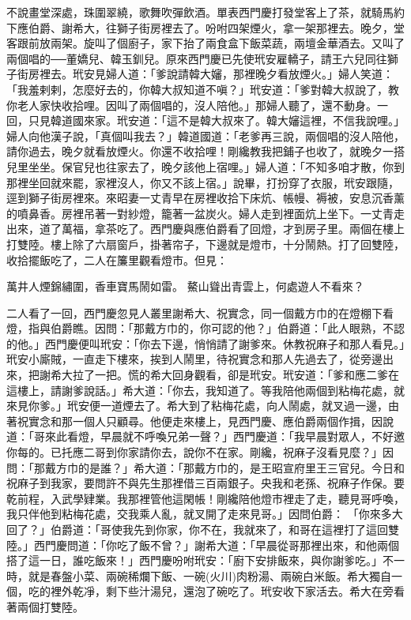 不說畫堂深處，珠圍翠繞，歌舞吹彈飲酒。單表西門慶打發堂客上了茶，就騎馬約下應伯爵、謝希大，往獅子街房裡去了。吩咐四架煙火，拿一架那裡去。晚夕，堂客跟前放兩架。旋叫了個廚子，家下抬了兩食盒下飯菜蔬，兩壇金華酒去。又叫了兩個唱的──董嬌兒、韓玉釧兒。原來西門慶已先使玳安雇轎子，請王六兒同往獅子街房裡去。玳安見婦人道：「爹說請韓大嬸，那裡晚夕看放煙火。」婦人笑道：「我羞剌剌，怎麼好去的，你韓大叔知道不嗔？」玳安道：「爹對韓大叔說了，教你老人家快收拾哩。因叫了兩個唱的，沒人陪他。」那婦人聽了，還不動身。一回，只見韓道國來家。玳安道：「這不是韓大叔來了。韓大嬸這裡，不信我說哩。」 婦人向他漢子說，「真個叫我去？」韓道國道：「老爹再三說，兩個唱的沒人陪他，請你過去，晚夕就看放煙火。你還不收拾哩！剛纔教我把鋪子也收了，就晚夕一搭兒里坐坐。保官兒也往家去了，晚夕該他上宿哩。」婦人道：「不知多咱才散，你到那裡坐回就來罷，家裡沒人，你又不該上宿。」說畢，打扮穿了衣服，玳安跟隨，逕到獅子街房裡來。來昭妻一丈青早在房裡收拾下床炕、帳幔、褥被，安息沉香薰的噴鼻香。房裡吊著一對紗燈，籠著一盆炭火。婦人走到裡面炕上坐下。一丈青走出來，道了萬福，拿茶吃了。西門慶與應伯爵看了回燈，才到房子里。兩個在樓上打雙陸。樓上除了六扇窗戶，掛著帘子，下邊就是燈市，十分鬧熱。打了回雙陸，收拾擺飯吃了，二人在簾里觀看燈市。但見：

萬井人煙錦繡圍，香車寶馬鬧如雷。
鰲山聳出青雲上，何處遊人不看來？

二人看了一回，西門慶忽見人叢里謝希大、祝實念，同一個戴方巾的在燈棚下看燈，指與伯爵瞧。因問：「那戴方巾的，你可認的他？」伯爵道：「此人眼熟，不認的他。」西門慶便叫玳安：「你去下邊，悄悄請了謝爹來。休教祝麻子和那人看見。」玳安小廝賊，一直走下樓來，挨到人鬧里，待祝實念和那人先過去了，從旁邊出來，把謝希大拉了一把。慌的希大回身觀看，卻是玳安。玳安道：「爹和應二爹在這樓上，請謝爹說話。」希大道：「你去，我知道了。等我陪他兩個到粘梅花處，就來見你爹。」玳安便一道煙去了。希大到了粘梅花處，向人鬧處，就叉過一邊，由著祝實念和那一個人只顧尋。他便走來樓上，見西門慶、應伯爵兩個作揖，因說道：「哥來此看燈，早晨就不呼喚兄弟一聲？」西門慶道：「我早晨對眾人，不好邀你每的。已托應二哥到你家請你去，說你不在家。剛纔，祝麻子沒看見麼？」因問：「那戴方巾的是誰？」希大道：「那戴方巾的，是王昭宣府里王三官兒。今日和祝麻子到我家，要問許不與先生那裡借三百兩銀子。央我和老孫、祝麻子作保。要乾前程，入武學肄業。我那裡管他這閑帳！剛纔陪他燈市裡走了走，聽見哥呼喚，我只伴他到粘梅花處，交我乘人亂，就叉開了走來見哥。」因問伯爵： 「你來多大回了？」伯爵道：「哥使我先到你家，你不在，我就來了，和哥在這裡打了這回雙陸。」西門慶問道：「你吃了飯不曾？」謝希大道：「早晨從哥那裡出來，和他兩個搭了這一日，誰吃飯來！」西門慶吩咐玳安：「廚下安排飯來，與你謝爹吃。」不一時，就是春盤小菜、兩碗稀爛下飯、一碗(火川)肉粉湯、兩碗白米飯。希大獨自一個，吃的裡外乾凈，剩下些汁湯兒，還泡了碗吃了。玳安收下家活去。希大在旁看著兩個打雙陸。

